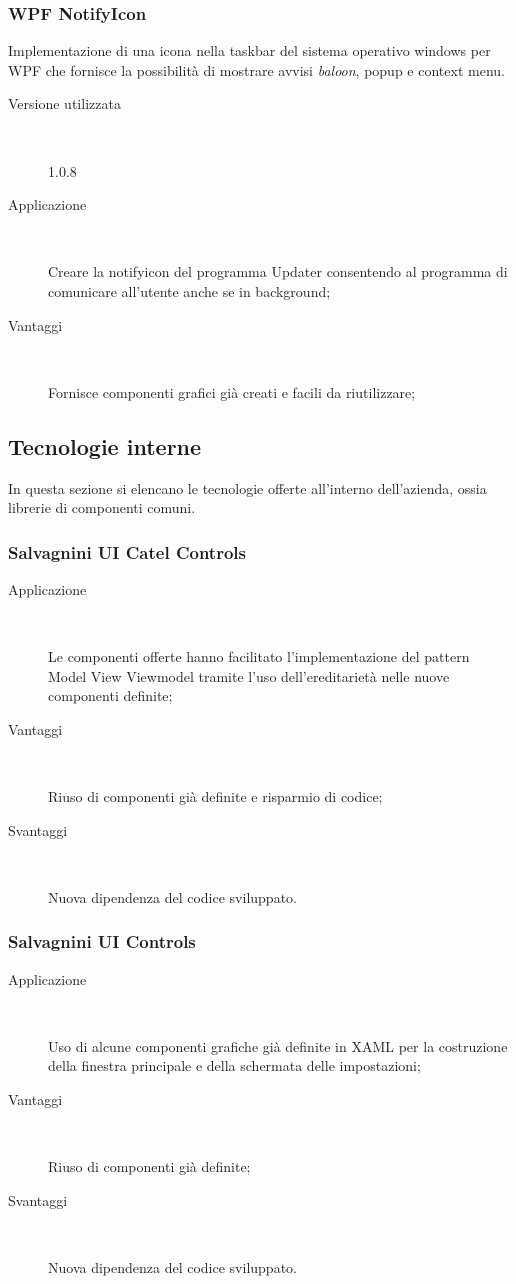 \documentclass[../RelazioneFinale.tex]{subfiles}
\begin{document}
			\subsubsection{WPF NotifyIcon}
				Implementazione di una icona nella taskbar del sistema operativo windows per WPF che fornisce la possibilità di mostrare avvisi \emph{baloon}, popup e context menu.
				\begin{description}
					\item[Versione utilizzata] \ \par 
					1.0.8
					\item[Applicazione] \ \par
					Creare la notifyicon del programma Updater consentendo al programma di comunicare all'utente anche se in background;
					\item[Vantaggi] \ \par
					Fornisce componenti grafici già creati e facili da riutilizzare;
				\end{description}
			
			\subsection{Tecnologie interne}
			In questa sezione si elencano le tecnologie offerte all'interno dell'azienda, ossia librerie di componenti comuni.
		
			\subsubsection{Salvagnini UI Catel Controls}
				\begin{description}
					\item[Applicazione] \ \par 
					Le componenti offerte hanno facilitato l'implementazione del pattern Model View Viewmodel tramite l'uso dell'ereditarietà nelle nuove componenti definite;
					\item[Vantaggi] \ \par
					Riuso di componenti già definite e risparmio di codice;
					\item[Svantaggi] \ \par 
					Nuova dipendenza del codice sviluppato.
				\end{description}
			
			\subsubsection{Salvagnini UI Controls}
				\begin{description}
					\item[Applicazione] \ \par 
					Uso di alcune componenti grafiche già definite in XAML per la costruzione della finestra principale e della schermata delle impostazioni;
					\item[Vantaggi] \ \par 
					Riuso di componenti già definite;
					\item[Svantaggi] \ \par
					Nuova dipendenza del codice sviluppato.
				\end{description}
\end{document}
